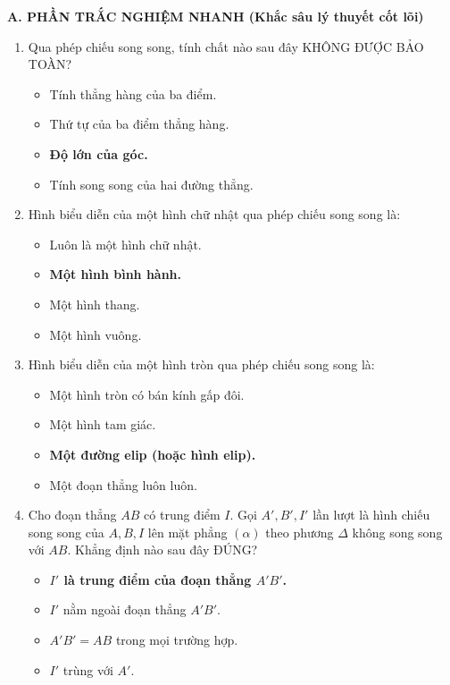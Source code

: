 \documentclass[12pt, a4paper]{article}
\begin{document}
\noindent \textbf{A. PHẦN TRẮC NGHIỆM NHANH (Khắc sâu lý thuyết cốt lõi)}
\begin{enumerate}[leftmargin=0.6cm]
    \item Qua phép chiếu song song, tính chất nào sau đây KHÔNG ĐƯỢC BẢO TOÀN?
    \begin{itemize}[leftmargin=0.6cm]
        \item[A.] Tính thẳng hàng của ba điểm.
        \item[B.] Thứ tự của ba điểm thẳng hàng.
        \item[\textbf{C.}] \textbf{Độ lớn của góc.}
        \item[D.] Tính song song của hai đường thẳng.
    \end{itemize}

    \item Hình biểu diễn của một hình chữ nhật qua phép chiếu song song là:
    \begin{itemize}[leftmargin=0.6cm]
        \item[A.] Luôn là một hình chữ nhật.
        \item[\textbf{B.}] \textbf{Một hình bình hành.}
        \item[C.] Một hình thang.
        \item[D.] Một hình vuông.
    \end{itemize}

    \item Hình biểu diễn của một hình tròn qua phép chiếu song song là:
    \begin{itemize}[leftmargin=0.6cm]
        \item[A.] Một hình tròn có bán kính gấp đôi.
        \item[B.] Một hình tam giác.
        \item[\textbf{C.}] \textbf{Một đường elip (hoặc hình elip).}
        \item[D.] Một đoạn thẳng luôn luôn.
    \end{itemize}

    \item Cho đoạn thẳng $AB$ có trung điểm $I$. Gọi $A', B', I'$ lần lượt là hình chiếu song song của $A, B, I$ lên mặt phẳng $(\alpha)$ theo phương $\Delta$ không song song với $AB$. Khẳng định nào sau đây ĐÚNG?
    \begin{itemize}[leftmargin=0.6cm]
        \item[\textbf{A.}] \textbf{$I'$ là trung điểm của đoạn thẳng $A'B'$.}
        \item[B.] $I'$ nằm ngoài đoạn thẳng $A'B'$.
        \item[C.] $A'B' = AB$ trong mọi trường hợp.
        \item[D.] $I'$ trùng với $A'$.
    \end{itemize}
\end{enumerate}
\end{document}
